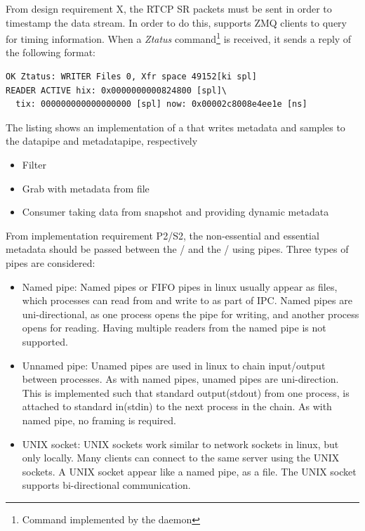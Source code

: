 From design requirement X, the RTCP SR packets must be sent in order to timestamp the data stream. In order to do this,  supports ZMQ clients to query for timing information. When a \textit{Ztatus} command\footnote{Command implemented by the  daemon} is received, it sends a reply of the following format:


\begin{listing}[H] 
\begin{verbatim}
OK Ztatus: WRITER Files 0, Xfr space 49152[ki spl]
READER ACTIVE hix: 0x0000000000824800 [spl]\ 
  tix: 000000000000000000 [spl] now: 0x00002c8008e4ee1e [ns]
\end{verbatim}
\caption{The listing shows an implementation of a \pro{} that writes metadata and samples to the datapipe and metadatapipe, respectively}
\label{lst:implementation:snapshot1}
\end{listing}


\begin{itemize}
	\item Filter
	\item Grab with metadata from file
	\item Consumer taking data from snapshot and providing dynamic metadata
\end{itemize}


From implementation requirement P2/S2, the non-essential and essential metadata should be passed between the \pub{}/\sub{} and the \con{}/\pro{} using pipes. Three types of pipes are considered:
\begin{itemize}
	\item Named pipe: Named pipes or FIFO pipes in linux usually appear as files, which processes can read from and write to as part of \ac{IPC}. Named pipes are uni-directional, as one process opens the pipe for writing, and another process opens for reading. Having multiple readers from the named pipe is not supported.
	
	\item Unnamed pipe: Unamed pipes are used in linux to chain input/output between processes. As with named pipes, unamed pipes are uni-direction. This is implemented such that standard output(stdout) from one process, is attached to standard in(stdin) to the next process in the chain. As with named pipe, no framing is required.
	
	\item UNIX socket: UNIX sockets work similar to network sockets in linux, but only locally. Many clients can connect to the same server using the UNIX sockets. A UNIX socket appear like a named pipe, as a file. The UNIX socket supports bi-directional communication. 
\end{itemize}

